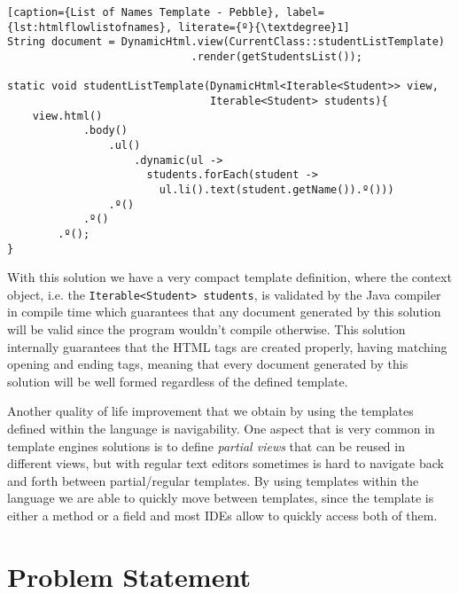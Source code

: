 \bigskip


\begin{minipage}{\linewidth}
\begin{lstlisting}[caption={List of Names Template - Pebble}, label={lst:htmlflowlistofnames}, literate={º}{\textdegree}1]
String document = DynamicHtml.view(CurrentClass::studentListTemplate)
                             .render(getStudentsList());
    
static void studentListTemplate(DynamicHtml<Iterable<Student>> view,                                
                                Iterable<Student> students){
    view.html()
            .body()
                .ul()
                    .dynamic(ul -> 
                      students.forEach(student ->                   
                        ul.li().text(student.getName()).º()))
                .º()
            .º()
        .º();
}
\end{lstlisting}
\end{minipage} 

\noindent
With this solution we have a very compact template definition, where the context object, i.e. the \texttt{Iterable<Student> students}, is validated by the Java compiler in compile time which guarantees that any document generated by this solution will be valid since the program wouldn't compile otherwise. This solution internally guarantees that the \ac{HTML} tags are created properly, having matching opening and ending tags, meaning that every document generated by this solution will be well formed regardless of the defined template. 

\noindent
Another quality of life improvement that we obtain by using the templates defined within the language is navigability. One aspect that is very common in template engines solutions is to define \textit{partial views} that can be reused in different views, but with regular text editors sometimes is hard to navigate back and forth between partial/regular templates. By using templates within the language we are able to quickly move between templates, since the template is either a method or a field and most \ac{IDE}s allow to quickly access both of them.

\section{Problem Statement}
\label{sec:problemstatement}

